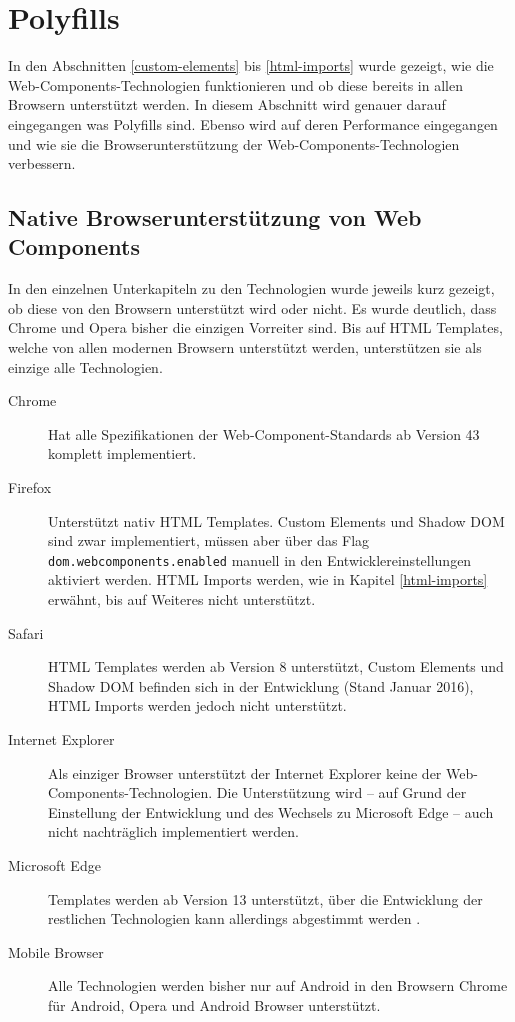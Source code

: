 \section{Polyfills}\label{polyfills-mit-webcomponents.js}

In den Abschnitten \ref{custom-elements} bis \ref{html-imports} wurde gezeigt, wie die Web-Components-Technologien funktionieren und ob diese bereits in allen Browsern unterstützt werden. In diesem Abschnitt wird genauer darauf eingegangen was Polyfills sind. Ebenso wird auf deren Performance eingegangen und wie sie die Browserunterstützung der Web-Components-Technologien verbessern.


\subsection{Native Browserunterstützung von Web Components}\label{native-browserunterstuxfctzung-von-web-components}

In den einzelnen Unterkapiteln zu den Technologien wurde jeweils kurz gezeigt, ob diese von den Browsern unterstützt wird oder nicht. Es wurde deutlich, dass Chrome und Opera bisher die einzigen Vorreiter sind. Bis auf \ac{HTML} Templates, welche von allen modernen Browsern unterstützt werden, unterstützen sie als einzige alle Technologien. \cite{citeulike:13914379}

\begin{description}
  \item[Chrome] Hat alle Spezifikationen der Web-Component-Standards ab Version 43 komplett implementiert.
  \item[Firefox] Unterstützt nativ \ac{HTML} Templates. Custom Elements und Shadow \ac{DOM} sind zwar implementiert, müssen aber über das Flag \texttt{dom.webcomponents.enabled} manuell in den Entwicklereinstellungen aktiviert werden. \ac{HTML} Imports werden, wie in Kapitel \ref{html-imports} erwähnt, bis auf Weiteres nicht unterstützt.
  \item[Safari] \ac{HTML} Templates werden ab Version 8 unterstützt, Custom Elements und Shadow \ac{DOM} befinden sich in der Entwicklung (Stand Januar 2016), \ac{HTML} Imports werden jedoch nicht unterstützt.
  \item[Internet Explorer] Als einziger Browser unterstützt der Internet Explorer keine der Web-Components-Technologien. Die Unterstützung wird -- auf Grund der Einstellung der Entwicklung und des Wechsels zu Microsoft Edge -- auch nicht nachträglich implementiert werden.
  \item[Microsoft Edge] Templates werden ab Version 13 unterstützt, über die Entwicklung der restlichen Technologien kann allerdings abgestimmt werden \cite{citeulike:13914237}.
  \item[Mobile Browser] Alle Technologien werden bisher nur auf Android in den Browsern Chrome für Android, Opera und Android Browser unterstützt.
\end{description}

